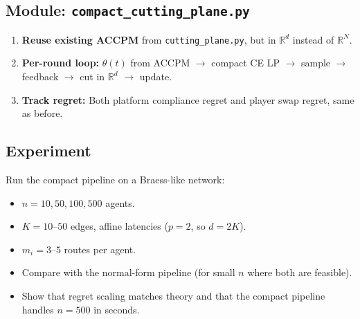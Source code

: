 \documentclass[11pt]{article}
\newcommand{\R}{\mathbb{R}}
\begin{document}
\subsection{Module: \texttt{compact\_cutting\_plane.py}}

\begin{enumerate}[nosep]
    \item \textbf{Reuse existing ACCPM} from \texttt{cutting\_plane.py}, but in $\R^d$ instead of $\R^N$.
    \item \textbf{Per-round loop:} $\theta(t)$ from ACCPM $\to$ compact CE LP $\to$ sample $\to$ feedback $\to$ cut in $\R^d$ $\to$ update.
    \item \textbf{Track regret:} Both platform compliance regret and player swap regret, same as before.
\end{enumerate}

\subsection{Experiment}

Run the compact pipeline on a Braess-like network:
\begin{itemize}[nosep]
    \item $n = 10, 50, 100, 500$ agents.
    \item $K = 10$--$50$ edges, affine latencies ($p=2$, so $d = 2K$).
    \item $m_i = 3$--$5$ routes per agent.
    \item Compare with the normal-form pipeline (for small $n$ where both are feasible).
    \item Show that regret scaling matches theory and that the compact pipeline handles $n = 500$ in seconds.
\end{itemize}
\end{document}
